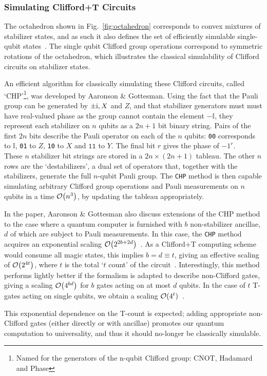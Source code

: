\documentclass{standalone}
\begin{document}
\subsubsection{Simulating Clifford+T Circuits}\label{sec:CHP}
The octahedron shown in Fig.~\ref{fig:octahedron} corresponds to convex mixtures of stabilizer states, and as such it also defines the set of efficiently simulable single-qubit states~\cite{Howard2014}. The single qubit Clifford group operations correspond to symmetric rotations of the octahedron, which illustrates the classical simulability of Clifford circuits on stabilizer states. 
\par
An efficient algorithm for classically simulating these Clifford circuits, called `CHP'\footnote{Named for the generators of the n-qubit Clifford group: CNOT, Hadamard and Phase}, was developed by Aaronson \& Gottesman. Using the fact that the Pauli group can be generated by $\pm\mathrm{i}, X$ and $Z$, and that stabilizer generators must must have real-valued phase as the group cannot contain the element $-\mathbb{I}$, they represent each stabilizer on $n$ qubits as a $2n+1$ bit binary string. Pairs of the first $2n$ bits describe the Pauli operator on each of the $n$ qubits: \texttt{00} corresponds to $\mathbb{I}$, \texttt{01} to $Z$, \texttt{10} to $X$ and $\texttt{11}$ to $Y$. The final bit $r$ gives the phase of $-1^{r}$.\\
These $n$ stabilizer bit strings are stored in a $2n\times(2n+1)$ tableau. The other $n$ rows are the `destabilizers', a dual set of operators that, together with the stabilizers, generate the full $n$-qubit Pauli group. The \texttt{CHP} method is then capable simulating arbitrary Clifford group operations and Pauli measurements on $n$ qubits in a time $\order{n^{3}}$, by updating the tableau appropriately.
\par
In the paper, Aaronson \& Gottesman also discuss extensions of the CHP method to the case where a quantum computer is furnished with $b$ non-stabilizer ancillae, $d$ of which are subject to Pauli measurements. In this case, the \texttt{CHP} method acquires an exponential scaling $\order{2^{2b+2d}}$~\cite{Aaronson2004a}. As a Clifford+T computing scheme would consume all magic states, this  implies $b=d\equiv t$, giving an effective scaling of $\order{2^{4t}}$, where $t$ is the total `$t$ count' of the circuit~\cite{Aaronson2004a,Bravyi2015}. Interestingly, this method performs lightly better if the formalism is adapted to describe non-Clifford gates, giving a scaling $\order{4^{bd}}$ for $b$ gates acting on at most $d$ qubits. In the case of $t$ T-gates acting on single qubits, we obtain a scaling $\order{4^{t}}$~\cite{Aaronson2004a}.
\par
This exponential dependence on the T-count is expected; adding appropriate non-Clifford gates (either directly or with ancillae) promotes our quantum computation to universality, and thus it should no-longer be classically simulable.
\end{document}
